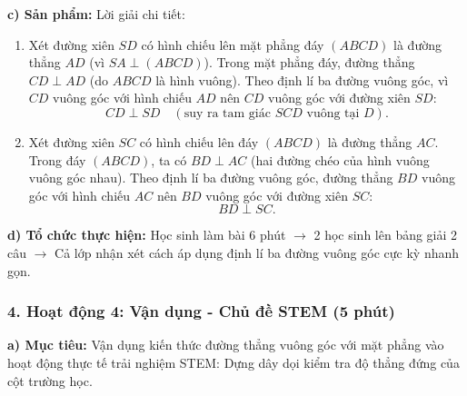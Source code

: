 \documentclass[12pt, a4paper]{article}
\begin{document}
\noindent \textbf{c) Sản phẩm:}
Lời giải chi tiết:
\begin{enumerate}[leftmargin=0.6cm]
    \item Xét đường xiên $SD$ có hình chiếu lên mặt phẳng đáy $(ABCD)$ là đường thẳng $AD$ (vì $SA \perp (ABCD)$).
    Trong mặt phẳng đáy, đường thẳng $CD \perp AD$ (do $ABCD$ là hình vuông).
    Theo định lí ba đường vuông góc, vì $CD$ vuông góc với hình chiếu $AD$ nên $CD$ vuông góc với đường xiên $SD$:
    $$CD \perp SD \quad (\text{suy ra tam giác } SCD \text{ vuông tại } D).$$
    \item Xét đường xiên $SC$ có hình chiếu lên đáy $(ABCD)$ là đường thẳng $AC$.
    Trong đáy $(ABCD)$, ta có $BD \perp AC$ (hai đường chéo của hình vuông vuông góc nhau).
    Theo định lí ba đường vuông góc, đường thẳng $BD$ vuông góc với hình chiếu $AC$ nên $BD$ vuông góc với đường xiên $SC$:
    $$BD \perp SC.$$
\end{enumerate}

\noindent \textbf{d) Tổ chức thực hiện:}
Học sinh làm bài 6 phút $\to$ 2 học sinh lên bảng giải 2 câu $\to$ Cả lớp nhận xét cách áp dụng định lí ba đường vuông góc cực kỳ nhanh gọn.

\subsubsection*{4. Hoạt động 4: Vận dụng - Chủ đề STEM (5 phút)}

\noindent \textbf{a) Mục tiêu:}
Vận dụng kiến thức đường thẳng vuông góc với mặt phẳng vào hoạt động thực tế trải nghiệm STEM: Dựng dây dọi kiểm tra độ thẳng đứng của cột trường học.
\end{document}
